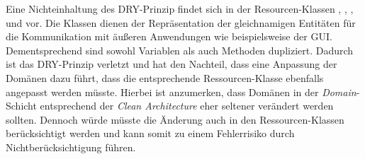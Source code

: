 Eine Nichteinhaltung des \ac{DRY}-Prinzip findet sich in der Resourcen-Klassen \href{}{\code{}}, \href{}{\code{}}, \href{}{\code{}}, \href{}{\code{}} und \href{}{\code{}} vor.
Die Klassen dienen der Repräsentation der gleichnamigen Entitäten für die Kommunikation mit äußeren Anwendungen wie beispielsweise der \ac{GUI}.
Dementsprechend sind sowohl Variablen als auch Methoden dupliziert.
Dadurch ist das \ac{DRY}-Prinzip verletzt und hat den Nachteil, dass eine Anpassung der Domänen dazu führt, dass die entsprechende Ressourcen-Klasse ebenfalls angepasst werden müsste.
Hierbei ist anzumerken, dass Domänen in der \textit{Domain}-Schicht entsprechend der \textit{Clean Architecture} eher seltener verändert werden sollten.
Dennoch würde müsste die Änderung auch in den Ressourcen-Klassen berücksichtigt werden und kann somit zu einem Fehlerrisiko durch Nichtberücksichtigung führen.
